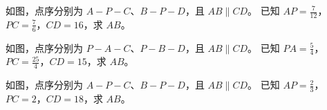 \documentclass{exam-zh}
\begin{document}

\begin{problem}[points=10]
  \noindent
  \begin{minipage}[t]{\dimexpr\linewidth-60mm-6mm\relax}
    \vspace{0pt}
    如图，点序分别为 $A-P-C$、$B-P-D$，且 $AB\parallel CD$。
已知 $AP=\frac{7}{12}$，$PC=\frac{7}{6}$，$CD=16$，求 $AB$。


  \end{minipage}\hfill
  \begin{diagramcoltikz}{60mm}{本题图}
  }
  \end{diagramcoltikz}
  \par\medskip
  \answerarea[38mm]
\end{problem}



\begin{problem}[points=10]
  \noindent
  \begin{minipage}[t]{\dimexpr\linewidth-60mm-6mm\relax}
    \vspace{0pt}
    如图，点序分别为 $P-A-C$、$P-B-D$，且 $AB\parallel CD$。
已知 $PA=\frac{5}{4}$，$PC=\frac{25}{4}$，$CD=15$，求 $AB$。


  \end{minipage}\hfill
  \begin{diagramcoltikz}{60mm}{本题图}
  }
  \end{diagramcoltikz}
  \par\medskip
  \answerarea[38mm]
\end{problem}



\begin{problem}[points=10]
  \noindent
  \begin{minipage}[t]{\dimexpr\linewidth-60mm-6mm\relax}
    \vspace{0pt}
    如图，点序分别为 $A-P-C$、$B-P-D$，且 $AB\parallel CD$。
已知 $AP=\frac{2}{3}$，$PC=2$，$CD=18$，求 $AB$。


  \end{minipage}\hfill
  \begin{diagramcoltikz}{60mm}{本题图}
  }
  \end{diagramcoltikz}
  \par\medskip
  \answerarea[38mm]
\end{problem}
\end{document}
